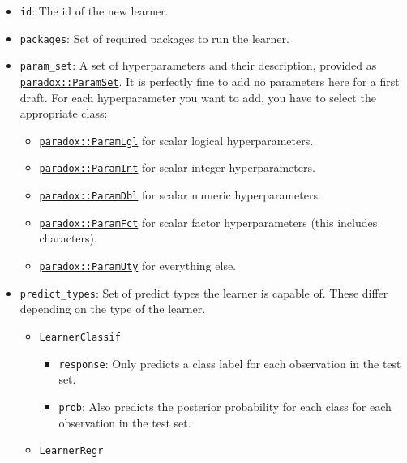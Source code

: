 \documentclass[]{article}
\providecommand{\tightlist}{%
  \setlength{\itemsep}{0pt}\setlength{\parskip}{0pt}}
\begin{document}
\begin{itemize}
\tightlist
\item
  \texttt{id}: The id of the new learner.
\item
  \texttt{packages}: Set of required packages to run the learner.
\item
  \texttt{param\_set}: A set of hyperparameters and their description, provided as \href{https://paradox.mlr-org.com/reference/ParamSet.html}{\texttt{paradox::ParamSet}}.
  It is perfectly fine to add no parameters here for a first draft.
  For each hyperparameter you want to add, you have to select the appropriate class:

  \begin{itemize}
  \tightlist
  \item
    \href{https://paradox.mlr-org.com/reference/ParamLgl.html}{\texttt{paradox::ParamLgl}} for scalar logical hyperparameters.
  \item
    \href{https://paradox.mlr-org.com/reference/ParamInt.html}{\texttt{paradox::ParamInt}} for scalar integer hyperparameters.
  \item
    \href{https://paradox.mlr-org.com/reference/ParamDbl.html}{\texttt{paradox::ParamDbl}} for scalar numeric hyperparameters.
  \item
    \href{https://paradox.mlr-org.com/reference/ParamFct.html}{\texttt{paradox::ParamFct}} for scalar factor hyperparameters (this includes characters).
  \item
    \href{https://paradox.mlr-org.com/reference/ParamUty.html}{\texttt{paradox::ParamUty}} for everything else.
  \end{itemize}
\item
  \texttt{predict\_types}: Set of predict types the learner is capable of.
  These differ depending on the type of the learner.

  \begin{itemize}
  \tightlist
  \item
    \texttt{LearnerClassif}

    \begin{itemize}
    \tightlist
    \item
      \texttt{response}: Only predicts a class label for each observation in the test set.
    \item
      \texttt{prob}: Also predicts the posterior probability for each class for each observation in the test set.
    \end{itemize}
  \item
    \texttt{LearnerRegr}


\end{itemize}
\end{itemize}
\end{document}
